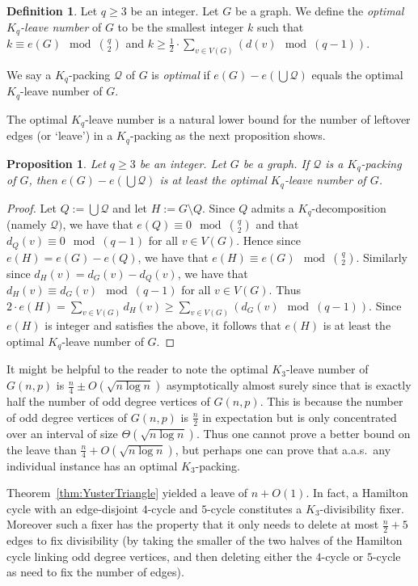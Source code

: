 \documentclass[11pt]{article}
\numberwithin{equation}{section}
\newcounter{i}
\theoremstyle{plain}
\newtheorem{proposition}[thm]{Proposition}
\theoremstyle{plain} %
\theoremstyle{definition}
\newtheorem{definition}[thm]{Definition}
\newcommand{\aas}{a.a.s.\ }
\begin{document}
\begin{definition}
Let $q\ge 3$ be an integer. Let $G$ be a graph. We define the \emph{optimal $K_q$-leave number} of $G$ to be the smallest integer $k$ such that $k\equiv e(G) \mod \binom{q}{2}$ and $k\ge \frac{1}{2} \cdot \sum_{v\in V(G)} (d(v) \mod (q-1))$.

We say a $K_q$-packing $\mathcal{Q}$ of $G$ is \emph{optimal} if $e(G)-e(\bigcup \mathcal{Q})$ equals the optimal $K_q$-leave number of $G$.
\end{definition}

The optimal $K_q$-leave number is a natural lower bound for the number of leftover edges (or `leave') in a $K_q$-packing as the next proposition shows.

\begin{proposition}
Let $q\ge 3$ be an integer. Let $G$ be a graph. If $\mathcal{Q}$ is a $K_q$-packing of $G$, then $e(G)-e(\bigcup \mathcal{Q})$ is at least the optimal $K_q$-leave number of $G$.
\end{proposition}
\begin{proof}
Let $Q:= \bigcup \mathcal{Q}$ and let $H:= G\setminus Q$. Since $Q$ admits a $K_q$-decomposition (namely $\mathcal{Q})$, we have that $e(Q) \equiv 0 \mod \binom{q}{2}$ and that $d_Q(v) \equiv 0 \mod (q-1)$ for all $v\in V(G)$. Hence since $e(H)=e(G)-e(Q)$, we have that $e(H) \equiv e(G) \mod \binom{q}{2}$. Similarly since $d_H(v) = d_G(v)-d_Q(v)$, we have that $d_H(v) \equiv d_G(v) \mod (q-1)$ for all $v\in V(G)$. Thus $2\cdot e(H) = \sum_{v\in V(G)} d_H(v) \ge \sum_{v\in V(G)} (d_G(v) \mod (q-1))$. Since $e(H)$ is integer and satisfies the above, it follows that $e(H)$ is at least the optimal $K_q$-leave number of $G$.    
\end{proof}

It might be helpful to the reader to note the optimal $K_3$-leave number of $G(n,p)$ is $\frac{n}{4} \pm O(\sqrt{n \log n})$ asymptotically almost surely since that is exactly half the number of odd degree vertices of $G(n,p)$. This is because the number of odd degree vertices of $G(n,p)$ is $\frac{n}{2}$ in expectation but is only concentrated over an interval of size $\Theta(\sqrt{n \log n})$. Thus one cannot prove a better bound on the leave than $\frac{n}{4} + O(\sqrt{n \log n})$, but perhaps one can prove that \aas any individual 
instance has an optimal $K_3$-packing.

Theorem~\ref{thm:YusterTriangle} yielded a leave of $n+O(1)$. In fact, a Hamilton cycle with an edge-disjoint $4$-cycle and $5$-cycle constitutes a $K_3$-divisibility fixer. Moreover such a fixer has the property that it only needs to delete at most $\frac{n}{2} + 5$ edges to fix divisibility (by taking the smaller of the two halves of the Hamilton cycle linking odd degree vertices, and then deleting either the $4$-cycle or $5$-cycle as need to fix the number of edges). 
\end{document}
